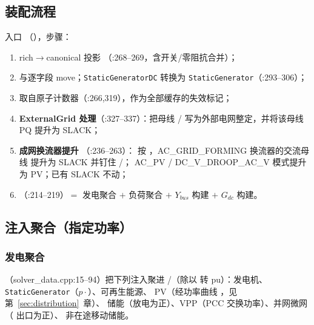 \subsection{装配流程}
入口 
（），步骤：
\begin{enumerate}
  \item rich$\to$canonical 投影 
        （:268--269，含开关/零阻抗合并）；
  \item {} 与逐字段 move；\texttt{StaticGeneratorDC}
        转换为 \texttt{StaticGenerator}（:293--306）；
  \item {} 取自原子计数器（:266,319），作为全部缓存的失效标记；
  \item \textbf{ExternalGrid 处理}（:327--337）：把母线 /
        写为外部电网整定，并将该母线 PQ 提升为 SLACK；
  \item \textbf{成网换流器提升} （:236--263）：
        按 ，AC\_GRID\_FORMING 换流器的交流母线
        提升为 SLACK 并钉住 /；
        AC\_PV / DC\_V\_DROOP\_AC\_V 模式提升为 PV；已有 SLACK 不动；
  \item {}（:214--219）$=$ 发电聚合 $+$ 负荷聚合 $+$
        $Y_{bus}$ 构建 $+$ $G_{dc}$ 构建。
\end{enumerate}

\subsection{注入聚合（指定功率）}
\subsubsection*{发电聚合}
（solver\_data.cpp:15--94）把下列注入聚进
/（除以  转 pu）：发电机、
\texttt{StaticGenerator}（$p\cdot$）、可再生能源、
PV（经功率曲线 ，见第~\ref{sec:distribution}~章）、
储能（放电为正）、VPP（PCC 交换功率）、并网微网（ 出口为正）、
非在途移动储能。

